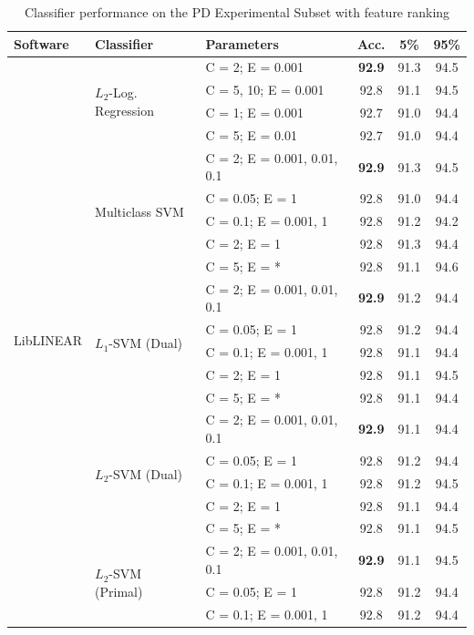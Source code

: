 \documentclass[12pt,notitlepage]{report}
\begin{document}
\begin{table}[htbp]
\caption{Classifier performance on the PD Experimental Subset with feature ranking}\label{tab:pd-classifiers}\footnotesize
\begin{center}
\shorthandoff{-}
\begin{tabular}{|l|l|l|c|c|c|}\hline
\bf Software & \bf Classifier & \bf Parameters & \bf Acc. & \bf 5\% & \bf 95\% \\\hline
\multirow{24}{*}{LibLINEAR} & \multirow{4}{*}{$L_2$-Log. Regression} & C = 2; E = 0.001 & \bf 92.9 & 91.3 & 94.5 \\
 & & C = 5, 10; E = 0.001 & 92.8 & 91.1 & 94.5 \\
 & & C = 1; E = 0.001 & 92.7 & 91.0 & 94.4 \\
 & & C = 5; E = 0.01 & 92.7 & 91.0 & 94.4 \\\cline{2-6}
 & \multirow{5}{*}{Multiclass SVM} & C = 2; E = 0.001, 0.01, 0.1 & \bf 92.9 & 91.3 & 94.5 \\ 
 &  & C = 0.05; E = 1 & 92.8 & 91.0 & 94.4 \\
 &  & C = 0.1; E = 0.001, 1 & 92.8 & 91.2 & 94.2 \\
 &  & C = 2; E = 1 & 92.8 & 91.3 & 94.4 \\
 & & C = 5; E = * & 92.8 & 91.1 & 94.6 \\\cline{2-6}
 & \multirow{5}{*}{$L_1$-SVM (Dual)} & C = 2; E = 0.001, 0.01, 0.1 & \bf 92.9 & 91.2 & 94.4 \\
 & & C = 0.05; E = 1 & 92.8 & 91.2 & 94.4 \\
 &  & C = 0.1; E = 0.001, 1 & 92.8 & 91.1 & 94.4 \\
 & & C = 2; E = 1 & 92.8 & 91.1 & 94.5 \\
 & & C = 5; E = * & 92.8 & 91.1 & 94.4 \\\cline{2-6}
 & \multirow{5}{*}{$L_2$-SVM (Dual)} & C = 2; E = 0.001, 0.01, 0.1 & \bf 92.9 & 91.1 & 94.4 \\
 &  & C = 0.05; E = 1 & 92.8 & 91.2 & 94.4 \\
 &  & C = 0.1; E = 0.001, 1 & 92.8 & 91.2 & 94.5 \\
 &  & C = 2; E = 1 & 92.8 & 91.1 & 94.4 \\
 & & C = 5; E = * & 92.8 & 91.1 & 94.5 \\\cline{2-6}
 & \multirow{5}{*}{$L_2$-SVM (Primal)} & C = 2; E = 0.001, 0.01, 0.1 & \bf 92.9 & 91.1 & 94.5 \\
 &  & C = 0.05; E = 1 & 92.8 & 91.2 & 94.4 \\
 &  & C = 0.1; E = 0.001, 1 & 92.8 & 91.2 & 94.4 \\

\end{tabular}
\end{center}
\end{table}
\end{document}
